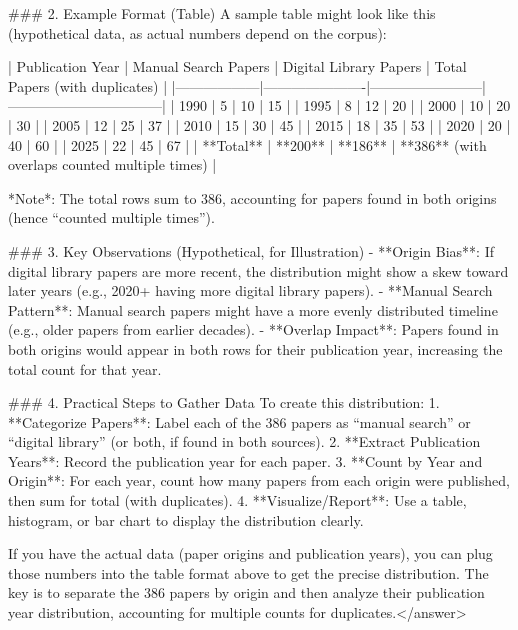 ### 2. Example Format (Table)  
A sample table might look like this (hypothetical data, as actual numbers depend on the corpus):  

| Publication Year | Manual Search Papers | Digital Library Papers | Total Papers (with duplicates) |
|------------------|----------------------|------------------------|---------------------------------|
| 1990             | 5                    | 10                     | 15                              |
| 1995             | 8                    | 12                     | 20                              |
| 2000             | 10                   | 20                     | 30                              |
| 2005             | 12                   | 25                     | 37                              |
| 2010             | 15                   | 30                     | 45                              |
| 2015             | 18                   | 35                     | 53                              |
| 2020             | 20                   | 40                     | 60                              |
| 2025             | 22                   | 45                     | 67                              |
| **Total**        | **200**              | **186**                | **386** (with overlaps counted multiple times) |  

*Note*: The total rows sum to 386, accounting for papers found in both origins (hence “counted multiple times”).  


### 3. Key Observations (Hypothetical, for Illustration)  
- **Origin Bias**: If digital library papers are more recent, the distribution might show a skew toward later years (e.g., 2020+ having more digital library papers).  
- **Manual Search Pattern**: Manual search papers might have a more evenly distributed timeline (e.g., older papers from earlier decades).  
- **Overlap Impact**: Papers found in both origins would appear in both rows for their publication year, increasing the total count for that year.  


### 4. Practical Steps to Gather Data  
To create this distribution:  
1. **Categorize Papers**: Label each of the 386 papers as “manual search” or “digital library” (or both, if found in both sources).  
2. **Extract Publication Years**: Record the publication year for each paper.  
3. **Count by Year and Origin**: For each year, count how many papers from each origin were published, then sum for total (with duplicates).  
4. **Visualize/Report**: Use a table, histogram, or bar chart to display the distribution clearly.  


If you have the actual data (paper origins and publication years), you can plug those numbers into the table format above to get the precise distribution. The key is to separate the 386 papers by origin and then analyze their publication year distribution, accounting for multiple counts for duplicates.</answer>